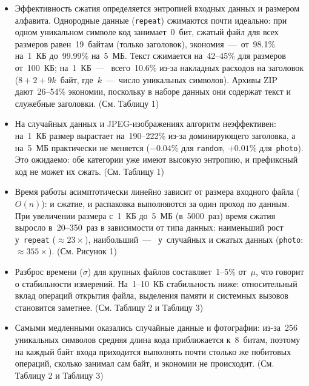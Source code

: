 \documentclass[a4paper]{article}
\begin{document}
\begin{itemize}
    \item Эффективность сжатия определяется энтропией входных данных
    и размером алфавита. Однородные данные (\texttt{repeat}) сжимаются
    почти идеально: при одном уникальном символе код занимает~0~бит,
    сжатый файл для всех размеров равен~19~байтам (только заголовок),
    экономия~---~от~98.1\% на~1~КБ до~99.99\% на~5~МБ. Текст
    сжимается на~42--45\% для размеров от~100~КБ; на~1~КБ~---~
    всего~10.6\% из-за накладных расходов на заголовок
    ($8 + 2 + 9k$~байт, где~$k$~---~число уникальных символов).
    Архивы ZIP дают~26--54\% экономии, поскольку в наборе данных
    они содержат текст и служебные заголовки. (См. Таблицу 1)

    \item На случайных данных и JPEG-изображениях алгоритм
    неэффективен: на~1~КБ размер вырастает на~190--222\%
    из-за доминирующего заголовка, а на~5~МБ практически
    не меняется ($-0.04\%$ для \texttt{random}, $+0.01\%$
    для~\texttt{photo}). Это ожидаемо: обе категории уже имеют
    высокую энтропию, и префиксный код не может их сжать. (См. Таблицу 1)

    \item Время работы асимптотически линейно зависит
    от размера входного файла ($O(n)$): и сжатие, и распаковка
    выполняются за один проход по данным. При увеличении размера
    с~1~КБ до~5~МБ (в~5000~раз) время сжатия выросло
    в~20--350~раз в зависимости от типа данных: наименьший рост
    у~\texttt{repeat} ($\approx 23\times$), наибольший~---~
    у~случайных и сжатых данных (\texttt{photo}: $\approx 355\times$). (См. Рисунок 1)

    \item Разброс времени ($\sigma$) для крупных файлов
    составляет~1--5\% от~$\mu$, что говорит о стабильности
    измерений. На~1--10~КБ стабильность ниже: относительный
    вклад операций открытия файла, выделения памяти и системных
    вызовов становится заметнее. (См. Таблицу 2 и Таблицу 3)

    \item Самыми медленными оказались случайные данные
    и фотографии: из-за~256 уникальных символов средняя длина
    кода приближается к~8~битам, поэтому на каждый байт входа
    приходится выполнять почти столько же побитовых операций,
    сколько занимал сам байт, и экономии не происходит. (См. Таблицу 2 и Таблицу 3)
\end{itemize}
\end{document}
